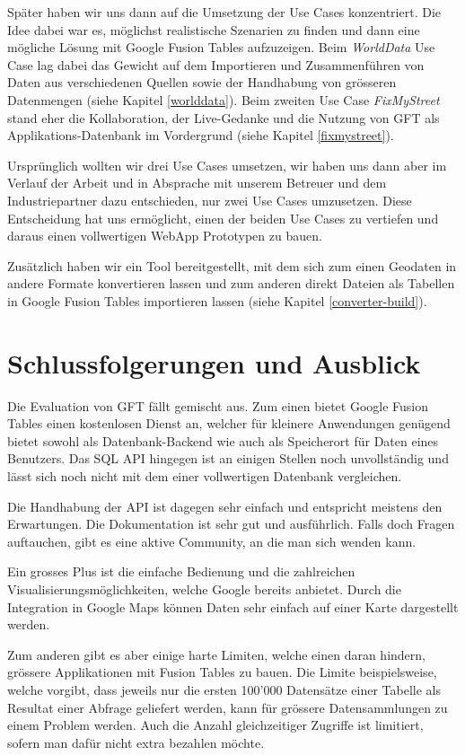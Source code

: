 Später haben wir uns dann auf die Umsetzung der Use Cases konzentriert. Die Idee dabei war es, möglichst realistische Szenarien zu finden und dann eine mögliche Lösung mit Google Fusion Tables aufzuzeigen. Beim \emph{WorldData} Use Case lag dabei das Gewicht auf dem Importieren und Zusammenführen von Daten aus verschiedenen Quellen sowie der Handhabung von grösseren Datenmengen (siehe Kapitel \ref{worlddata}). Beim zweiten Use Case \emph{FixMyStreet} stand eher die Kollaboration, der Live-Gedanke und die Nutzung von GFT als Applikations-Datenbank im Vordergrund (siehe Kapitel \ref{fixmystreet}).

Ursprünglich wollten wir drei Use Cases umsetzen, wir haben uns dann aber im Verlauf der Arbeit und in Absprache mit unserem Betreuer und dem Industriepartner dazu entschieden, nur zwei Use Cases umzusetzen. Diese Entscheidung hat uns ermöglicht, einen der beiden Use Cases zu vertiefen und daraus einen vollwertigen \gls{WebApp} Prototypen zu bauen.

Zusätzlich haben wir ein Tool bereitgestellt, mit dem sich zum einen Geodaten in andere Formate konvertieren lassen und zum anderen direkt Dateien als Tabellen in Google Fusion Tables importieren lassen (siehe Kapitel \ref{converter-build}).

\section{Schlussfolgerungen und Ausblick}
Die Evaluation von GFT fällt gemischt aus. Zum einen bietet Google Fusion Tables einen kostenlosen Dienst an, welcher für kleinere Anwendungen genügend bietet sowohl als Datenbank-Backend wie auch als Speicherort für Daten eines Benutzers. Das SQL \gls{API} hingegen ist an einigen Stellen noch unvollständig und lässt sich noch nicht mit dem einer vollwertigen Datenbank vergleichen.

Die Handhabung der \gls{API} ist dagegen sehr einfach und entspricht meistens den Erwartungen. Die Dokumentation ist sehr gut und ausführlich. Falls doch Fragen auftauchen, gibt es eine aktive Community, an die man sich wenden kann. 

Ein grosses Plus ist die einfache Bedienung und die zahlreichen Visualisierungsmöglichkeiten, welche Google bereits anbietet. Durch die Integration in Google Maps können Daten sehr einfach auf einer Karte dargestellt werden.

Zum anderen gibt es aber einige harte Limiten, welche einen daran hindern, grössere Applikationen mit Fusion Tables zu bauen. Die Limite beispielsweise, welche vorgibt, dass jeweils nur die ersten 100'000 Datensätze einer Tabelle als Resultat einer Abfrage geliefert werden, kann für grössere Datensammlungen zu einem Problem werden. Auch die Anzahl gleichzeitiger Zugriffe ist limitiert, sofern man dafür nicht extra bezahlen möchte.


